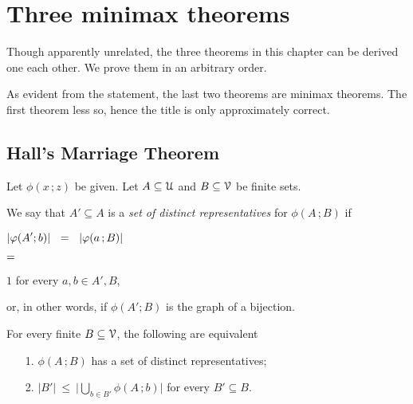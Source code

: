 \documentclass[scombinatorics.tex]{subfiles}
\begin{document}
\chapter{Three minimax theorems}
\label{minimax}

\def\medrel#1{\parbox[t]{6ex}{$\displaystyle\hfil #1$}}
\def\ceq#1#2#3{\parbox[t]{30ex}{$\displaystyle #1$}\medrel{#2}{$\displaystyle #3$}}

\def\separatore{\hfil o \rule[0.5ex]{4ex}{0.1ex} o \rule[0.5ex]{4ex}{0.1ex} o}

Though apparently unrelated, the three theorems in this chapter can be derived one each other.
We prove them in an arbitrary order.

As evident from the statement, the last two theorems are minimax theorems.
The first theorem less so, hence the title is only approximately correct.

\section{Hall's Marriage Theorem}\label{marriage}

\def\ceq#1#2#3{\parbox[t]{30ex}{$\displaystyle #1$}\medrel{#2}{$\displaystyle #3$}}

Let $\phi(x\,;z)$ be given. 
Let $A\subseteq\EuScript U$ and $B\subseteq\EuScript V$ be finite sets. 

We say that $A'\subseteq A$ is a \emph{set of distinct representatives\/} for $\phi(A\,;B)$ if

\ceq{\hfill|\phi(A';b)|\medrel{=}|\phi(a\,;B)|}
{=}
{1}
\quad for every $a,b\in A',B$,

or, in other words, if $\phi(A';B)$ is the graph of a bijection.

\begin{void_thm}\label{thm_marriage}
  For every finite $B\subseteq\EuScript V$, the following are equivalent
  \begin{itemize}
    \item[1.] $\phi(A\,;B)$ has a set of distinct representatives;

    \item[2.] $\displaystyle|B'|\ \le\ \bigg|\bigcup_{b\in B'}\phi(A\,;b)\bigg|$ for every $B'\subseteq B$.
  \end{itemize}
\end{void_thm}
\end{document}
